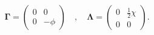 \begin{equation}
\mathbf{\Gamma =}\left(
\begin{array}{cc}
0 & 0 \\
0 & -\phi
\end{array}
\right)\quad,\quad \mathbf{\Lambda =}\left(
\begin{array}{cc}
0 & \frac{1}{2}\chi  \\
0 & 0
\end{array}
\right) .
\end{equation}

